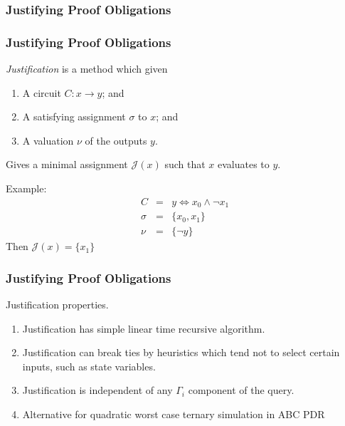 \documentclass{beamer}
\begin{document}
\subsubsection{Justifying Proof Obligations}
\begin{frame}
	\frametitle{Justifying Proof Obligations}
	{\em Justification} is a method which given
	\begin{enumerate}
		\item A circuit $C: x \to y$; and
		\item A satisfying assignment $\sigma$ to $x$; and
		\item A valuation $\nu$ of the outputs $y$.
	\end{enumerate}
	Gives a minimal assignment $\mathcal{J}(x)$ such that $x$ evaluates to $y$.

	Example:
	\begin{align*}
		C & = & y \iff x_0 \wedge \neg x_1\\
		\sigma & = & \{ x_0, x_1 \}\\
		\nu & = & \{ \neg y \}
	\end{align*}
	Then $\mathcal{J}(x) = \{ x_1 \}$

\end{frame}

\begin{frame}
	\frametitle{Justifying Proof Obligations}
	Justification properties.
	\begin{enumerate}
		\item Justification has simple linear time recursive algorithm.
		\item Justification can break ties by heuristics which tend not
			to select certain inputs, such as state variables.
		\item Justification is independent of any $\Gamma_i$ component
			of the query. 
		\item Alternative for quadratic worst case ternary simulation in
			ABC PDR
	\end{enumerate}
\end{frame}
\end{document}
